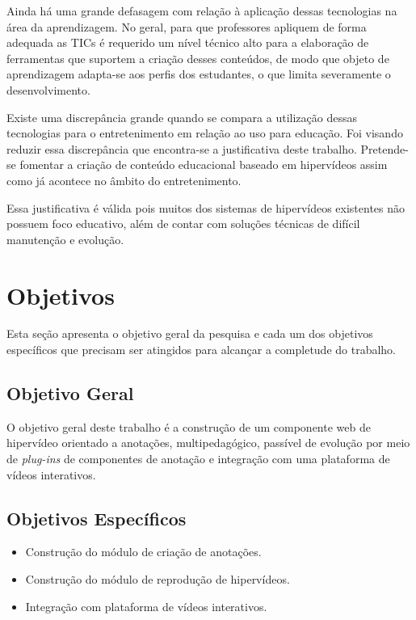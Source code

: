 Ainda há uma grande defasagem com relação à aplicação dessas tecnologias na área da aprendizagem. No geral, para que professores apliquem de forma adequada as TICs é requerido um nível técnico alto para a elaboração de ferramentas que suportem a criação desses conteúdos, de modo que objeto de aprendizagem adapta-se aos perfis dos estudantes, o que limita severamente o desenvolvimento.

Existe uma discrepância grande quando se compara a utilização dessas tecnologias para o entretenimento em relação ao uso para educação. Foi visando reduzir essa discrepância que encontra-se a justificativa deste trabalho. Pretende-se fomentar a criação de conteúdo educacional baseado em hipervídeos assim como já acontece no âmbito do entretenimento.

Essa justificativa é válida pois muitos dos sistemas de hipervídeos existentes não possuem foco educativo, além de contar com soluções técnicas de difícil manutenção e evolução.

\section{Objetivos}

Esta seção apresenta o objetivo geral da pesquisa e cada um dos objetivos específicos que precisam ser atingidos para alcançar a completude do trabalho.

\subsection{Objetivo Geral}

O objetivo geral deste trabalho é a construção de um componente web de hipervídeo orientado a anotações, multipedagógico, passível de evolução por meio de \textit{plug-ins} de componentes de anotação e integração com uma plataforma de vídeos interativos.

\subsection{Objetivos Específicos}

\begin{itemize}
	\item Construção do módulo de criação de anotações.
	\item Construção do módulo de reprodução de hipervídeos.
	\item Integração com plataforma de vídeos interativos.
\end{itemize}

